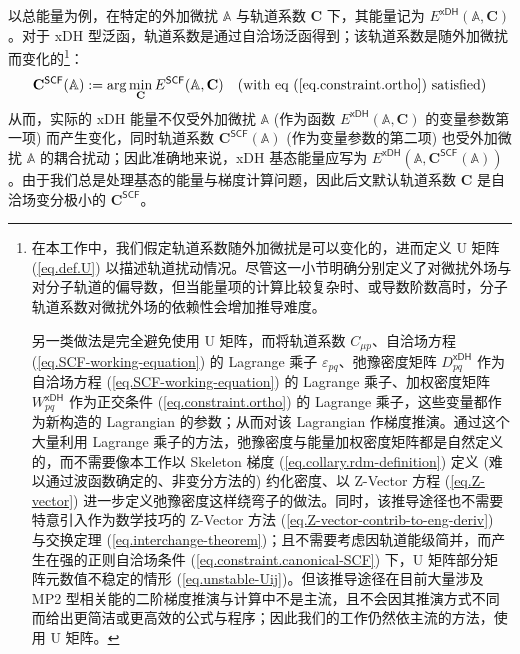 以总能量为例，在\textsf{特定的}外加微扰 $\mathbb{A}$ 与轨道系数 $\mathbf{C}$ 下，其能量记为 $E^\textsf{xDH} (\mathbb{A}, \mathbf{C})$。对于 xDH 型泛函，轨道系数是通过自洽场泛函得到；该轨道系数是随外加微扰而变化的\footnote{在本工作中，我们假定轨道系数随外加微扰是可以变化的，进而定义 U 矩阵 (\ref{eq.def.U}) 以描述轨道扰动情况\cite{Handy-Schaefer.JCP.1984}。尽管这一小节明确分别定义了对微扰外场与对分子轨道的偏导数，但当能量项的计算比较复杂时、或导数阶数高时，分子轨道系数对微扰外场的依赖性会增加推导难度。

另一类做法是完全避免使用 U 矩阵，而将轨道系数 $C_{\mu p}$、自洽场方程 (\ref{eq.SCF-working-equation}) 的 Lagrange 乘子 $\varepsilon_{pq}$、弛豫密度矩阵 $D_{pq}^\textsf{xDH}$ 作为自洽场方程 (\ref{eq.SCF-working-equation}) 的 Lagrange 乘子、加权密度矩阵 $W_{pq}^\textsf{xDH}$ 作为正交条件 (\ref{eq.constraint.ortho}) 的 Lagrange 乘子，这些变量都作为新构造的 Lagrangian 的参数；从而对该 Lagrangian 作梯度推演\cite{Helgaker-Joergensen.TCA.1989, Burow-Eshuis.JCTC.2014}。通过这个大量利用 Lagrange 乘子的方法，弛豫密度与能量加权密度矩阵都是自然定义的，而不需要像本工作以 Skeleton 梯度 (\ref{eq.collary.rdm-definition}) 定义 (难以通过波函数确定的、非变分方法的) 约化密度、以 Z-Vector 方程 (\ref{eq.Z-vector}) 进一步定义弛豫密度这样绕弯子的做法。同时，该推导途径也不需要特意引入作为数学技巧的 Z-Vector 方法 (\ref{eq.Z-vector-contrib-to-eng-deriv}) 与交换定理 (\ref{eq.interchange-theorem})；且不需要考虑因轨道能级简并，而产生在强的正则自洽场条件 (\ref{eq.constraint.canonical-SCF}) 下，U 矩阵部分矩阵元数值不稳定的情形 (\ref{eq.unstable-Uij})。但该推导途径在目前大量涉及 MP2 型相关能的二阶梯度推演与计算中不是主流，且不会因其推演方式不同而给出更简洁或更高效的公式与程序；因此我们的工作仍然依主流的方法，使用 U 矩阵。\label{footnote.full-lagrangian}}：
\begin{equation*}
  \mathbf{C}^\textsf{SCF} (\mathbb{A}) := \arg \min_\mathbf{C} E^\textsf{SCF} (\mathbb{A}, \mathbf{C}) \quad \text{(with eq (\ref{eq.constraint.ortho}) satisfied)}
\end{equation*}
从而，实际的 xDH 能量不仅受外加微扰 $\mathbb{A}$ (作为函数 $E^\textsf{xDH} (\mathbb{A}, \mathbf{C})$ 的变量参数第一项) 而产生变化，同时轨道系数 $\mathbf{C}^\textsf{SCF} (\mathbb{A})$ (作为变量参数的第二项) 也受外加微扰 $\mathbb{A}$ 的耦合扰动；因此准确地来说，xDH \textsf{基态能量}应写为 $E^\textsf{xDH} (\mathbb{A}, \mathbf{C}^\textsf{SCF} (\mathbb{A}))$。由于我们总是处理基态的能量与梯度计算问题，因此后文默认轨道系数 $\mathbf{C}$ 是自洽场变分极小的 $\mathbf{C}^\textsf{SCF}$。

